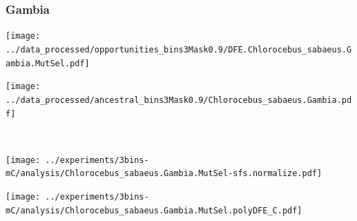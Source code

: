 \subsubsection{Gambia}

\begin{minipage}{0.49\linewidth}
    \texttt{[image: ../data\_processed/opportunities\_bins3Mask0.9/DFE.Chlorocebus\_sabaeus.Gambia.MutSel.pdf]}
\end{minipage}
\begin{minipage}{0.49\linewidth}
    \texttt{[image: ../data\_processed/ancestral\_bins3Mask0.9/Chlorocebus\_sabaeus.Gambia.pdf]}
\end{minipage}
\\
\begin{minipage}{0.49\linewidth}
    \texttt{[image: ../experiments/3bins-mC/analysis/Chlorocebus\_sabaeus.Gambia.MutSel-sfs.normalize.pdf]}
\end{minipage}
\begin{minipage}{0.4\linewidth}
    \texttt{[image: ../experiments/3bins-mC/analysis/Chlorocebus\_sabaeus.Gambia.MutSel.polyDFE\_C.pdf]}
\end{minipage}
